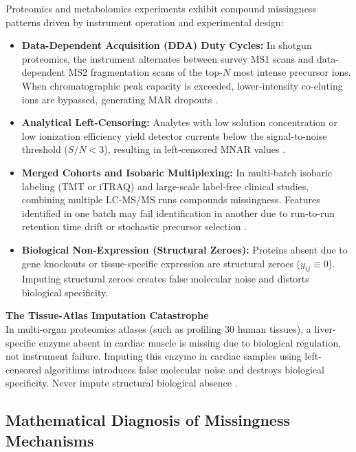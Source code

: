 \documentclass[11pt,oneside]{book}
\begin{document}
Proteomics and metabolomics experiments exhibit compound missingness patterns driven by instrument operation and experimental design:
\begin{itemize}
    \item \textbf{Data-Dependent Acquisition (DDA) Duty Cycles:} In shotgun proteomics, the instrument alternates between survey MS1 scans and data-dependent MS2 fragmentation scans of the top-$N$ most intense precursor ions. When chromatographic peak capacity is exceeded, lower-intensity co-eluting ions are bypassed, generating MAR dropouts \cite{cox2014maxlfq, julian2024rprogramming}.
    \item \textbf{Analytical Left-Censoring:} Analytes with low solution concentration or low ionization efficiency yield detector currents below the signal-to-noise threshold ($S/N < 3$), resulting in left-censored MNAR values \cite{karpievitch2012normalization, lazar2016accounting}.
    \item \textbf{Merged Cohorts and Isobaric Multiplexing:} In multi-batch isobaric labeling (TMT or iTRAQ) and large-scale label-free clinical studies, combining multiple LC-MS/MS runs compounds missingness. Features identified in one batch may fail identification in another due to run-to-run retention time drift or stochastic precursor selection \cite{palstrom2020imputation, mcalister2014multinotch}.
    \item \textbf{Biological Non-Expression (Structural Zeroes):} Proteins absent due to gene knockouts or tissue-specific expression are structural zeroes ($y_{ij} \equiv 0$). Imputing structural zeroes creates false molecular noise and distorts biological specificity.
\end{itemize}

\begin{pitfallbox}
\textbf{The Tissue-Atlas Imputation Catastrophe}\\
In multi-organ proteomics atlases (such as profiling 30 human tissues), a liver-specific enzyme absent in cardiac muscle is missing due to biological regulation, not instrument failure. Imputing this enzyme in cardiac samples using left-censored algorithms introduces false molecular noise and destroys biological specificity. Never impute structural biological absence \cite{lazar2016accounting}.
\end{pitfallbox}

\subsection{Mathematical Diagnosis of Missingness Mechanisms}
\end{document}
